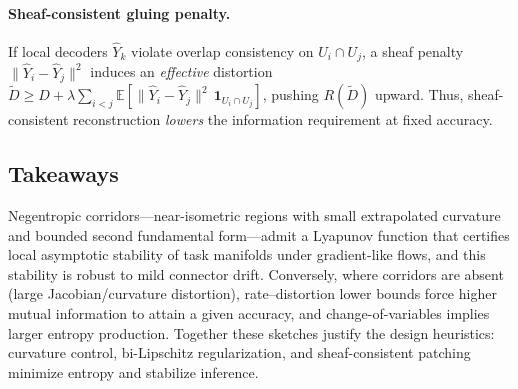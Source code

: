 \documentclass{article}
\theoremstyle{definition}
\begin{document}
\paragraph{Sheaf-consistent gluing penalty.}
If local decoders $\widehat Y_k$ violate overlap consistency on $U_i\cap U_j$,
a sheaf penalty $\|\widehat Y_i-\widehat Y_j\|^2$ induces an \emph{effective}
distortion $\widetilde D \ge D + \lambda \sum_{i<j} \mathbb{E}
[\|\widehat Y_i-\widehat Y_j\|^2\,\mathbf{1}_{U_i\cap U_j}]$, pushing $R(\widetilde D)$
upward. Thus, sheaf-consistent reconstruction \emph{lowers} the information
requirement at fixed accuracy.

\subsection{Takeaways}

Negentropic corridors---near-isometric regions with small extrapolated curvature
and bounded second fundamental form---admit a Lyapunov function that certifies
local asymptotic stability of task manifolds under gradient-like flows, and this
stability is robust to mild connector drift. Conversely, where corridors are
absent (large Jacobian/curvature distortion), rate--distortion lower bounds
force higher mutual information to attain a given accuracy, and change-of-variables
implies larger entropy production. Together these sketches justify the design
heuristics: curvature control, bi-Lipschitz regularization, and sheaf-consistent
patching minimize entropy and stabilize inference.

\newpage


\end{document}
